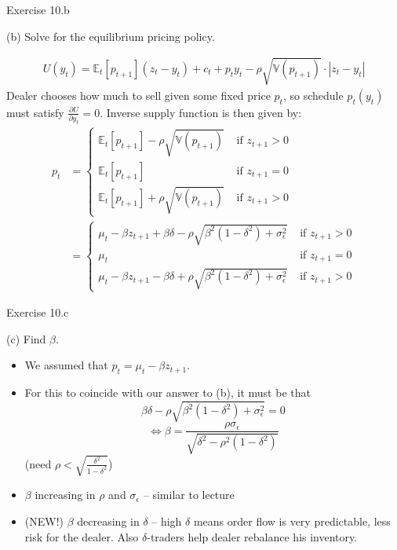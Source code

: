 \documentclass[english,10pt]{beamer}
\begin{document}
\begin{frame}{Exercise 10.b}
	\begin{exampleblock}{}
		(b) Solve for the equilibrium pricing policy.
	\end{exampleblock}

	\begin{align*}
		U(y_t) = \mathbb{E}_t [p_{t+1}] (z_t - y_t) + c_t + p_t y_t - \rho \sqrt{\mathbb{V}(p_{t+1})} \cdot | z_t - y_t |
	\end{align*}
	Dealer chooses how much to sell given some fixed price $p_t$, so schedule $p_t(y_t)$ must satisfy $\frac{\partial U}{\partial y_t} = 0$. Inverse supply function is then given by:
	\pause
	\begin{align*}
		p_t &= 
		\begin{cases}
			\mathbb{E}_t [p_{t+1}] - \rho \sqrt{\mathbb{V}(p_{t+1})} & \text{ if } z_{t+1} > 0
			\\
			\mathbb{E}_t [p_{t+1}] & \text{ if } z_{t+1} = 0
			\\
			\mathbb{E}_t [p_{t+1}] + \rho \sqrt{\mathbb{V}(p_{t+1})} & \text{ if } z_{t+1} > 0
		\end{cases}
		\\
		&= 
		\begin{cases}
		\mu_t - \beta z_{t+1} + \beta \delta - \rho \sqrt{\beta^2 (1-\delta^2) + \sigma_\epsilon^2} & \text{ if } z_{t+1} > 0
		\\
		\mu_t & \text{ if } z_{t+1} = 0
		\\
		\mu_t - \beta z_{t+1} - \beta \delta + \rho \sqrt{\beta^2 (1-\delta^2) + \sigma_\epsilon^2} & \text{ if } z_{t+1} > 0
		\end{cases}
	\end{align*}
\end{frame}


\begin{frame}{Exercise 10.c}
	\begin{exampleblock}{}
		(c) Find $\beta$.
	\end{exampleblock}
	
	\pause
	\begin{itemize}
		\item We assumed that $p_t = \mu_t - \beta z_{t+1}$.
		\item For this to coincide with our answer to (b), it must be that 
		$$ \beta \delta - \rho \sqrt{\beta^2 (1-\delta^2) + \sigma_\epsilon^2} = 0 $$
		$$ \Leftrightarrow \beta = \frac{\rho \sigma_\epsilon}{\sqrt{\delta^2 - \rho^2(1-\delta^2)}} $$
		(need $\rho < \sqrt{\frac{\delta^2}{1 - \delta^2}}$)
		\item $\beta$ increasing in $\rho$ and $\sigma_\epsilon$ -- similar to lecture
		\item (NEW!) $\beta$ decreasing in $\delta$ -- high $\delta$ means order flow is very predictable, less risk for the dealer. Also $\delta$-traders help dealer rebalance his inventory.
	\end{itemize}
\end{frame}
\end{document}
